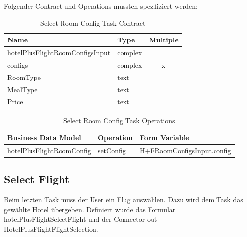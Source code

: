 Folgender Contract und Operations mussten spezifiziert werden:
\begin{table}[H] 
	\caption{Select Room Config Task Contract}
	\centering
	
	\begin{tabular}{ | l | l | c | } 
		\hline
		\textbf{Name} & \textbf{Type} & \textbf{Multiple} \\ \hline 
		hotelPlusFlightRoomConfigsInput & complex & \\ \hline
		\hspace*{5mm}configs & complex & x \\ \hline
		\hspace*{10mm}RoomType & text & \\ \hline
		\hspace*{10mm}MealType & text & \\ \hline
		\hspace*{10mm}Price & text & \\ \hline
	\end{tabular} 
\end{table}
\begin{table}[H] 
	\caption{Select Room Config Task Operations}
	\centering
	
	\begin{tabular}{ | l | l | l | } 
		\hline
		\textbf{Business Data Model} & \textbf{Operation} & \textbf{Form Variable} \\ \hline 
		hotelPlusFlightRoomConfig & setConfig & H+FRoomConfigsInput.config \\ \hline
	\end{tabular} 
\end{table}

\subsection{Select Flight}
Beim letzten Task muss der User ein Flug auswählen. Dazu wird dem Task das gewählte Hotel übergeben. Definiert wurde das Formular hotelPlusFlightSelectFlight und der Connector out HotelPlusFlightFlightSelection.

